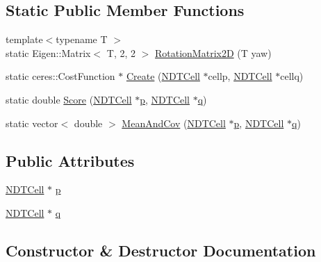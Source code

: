 \subsection*{Static Public Member Functions}
\begin{DoxyCompactItemize}
\item 
{\footnotesize template$<$typename T $>$ }\\static Eigen\+::\+Matrix$<$ T, 2, 2 $>$ \hyperlink{structCostFunctor_ae0785d2abc318696cb6dc01fac237881}{Rotation\+Matrix2D} (T yaw)
\item 
static ceres\+::\+Cost\+Function $\ast$ \hyperlink{structCostFunctor_a6f4d3f5dfe5d7c575c1f5dbcc86fed93}{Create} (\hyperlink{classNDTCell}{N\+D\+T\+Cell} $\ast$cellp, \hyperlink{classNDTCell}{N\+D\+T\+Cell} $\ast$cellq)
\item 
static double \hyperlink{structCostFunctor_a944445b87b51172a0d0037504e9dcadd}{Score} (\hyperlink{classNDTCell}{N\+D\+T\+Cell} $\ast$\hyperlink{structCostFunctor_a226fe7b0cb5dab732c9418d9d6d36cc9}{p}, \hyperlink{classNDTCell}{N\+D\+T\+Cell} $\ast$\hyperlink{structCostFunctor_aced002cbe4f5b36d02e36f460de4c89f}{q})
\item 
static vector$<$ double $>$ \hyperlink{structCostFunctor_ae875000950da1578f746dc343af34c94}{Mean\+And\+Cov} (\hyperlink{classNDTCell}{N\+D\+T\+Cell} $\ast$\hyperlink{structCostFunctor_a226fe7b0cb5dab732c9418d9d6d36cc9}{p}, \hyperlink{classNDTCell}{N\+D\+T\+Cell} $\ast$\hyperlink{structCostFunctor_aced002cbe4f5b36d02e36f460de4c89f}{q})
\end{DoxyCompactItemize}
\subsection*{Public Attributes}
\begin{DoxyCompactItemize}
\item 
\hyperlink{classNDTCell}{N\+D\+T\+Cell} $\ast$ \hyperlink{structCostFunctor_a226fe7b0cb5dab732c9418d9d6d36cc9}{p}
\item 
\hyperlink{classNDTCell}{N\+D\+T\+Cell} $\ast$ \hyperlink{structCostFunctor_aced002cbe4f5b36d02e36f460de4c89f}{q}
\end{DoxyCompactItemize}


\subsection{Constructor \& Destructor Documentation}
\mbox{\label{structCostFunctor_a970e75f6f339f881419ffebdba79ddc0}} 
